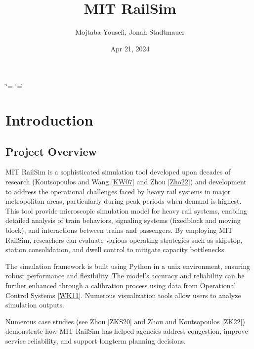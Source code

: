 \documentclass[letterpaper,10pt,english]{sphinxmanual}
\title{MIT RailSim}
\date{Apr 21, 2024}
\author{Mojtaba Yousefi, Jonah Stadtmauer}
\begin{document}
\ifdefined\shorthandoff
  \ifnum\catcode`\=\string=\active\shorthandoff{=}\fi
  \ifnum\catcode`\"=\active{}\fi
\fi

\pagestyle{empty}
\sphinxmaketitle
\pagestyle{plain}
\sphinxtableofcontents
\pagestyle{normal}
\label{\detokenize{index::doc}}


\sphinxstepscope


\chapter{Introduction}
\label{\detokenize{introduction:introduction}}\label{\detokenize{introduction::doc}}

\section{Project Overview}
\label{\detokenize{introduction:project-overview}}
\sphinxAtStartPar
MIT RailSim is a sophisticated simulation tool developed upon decades of research (Koutsopoulos and Wang {[}\hyperlink{cite.introduction:id7}{KW07}{]} and Zhou {[}\hyperlink{cite.introduction:id10}{Zho22}{]}) and development to address the operational challenges faced by heavy rail systems in major metropolitan areas, particularly during peak periods when demand is highest. This tool provide microscopic simulation model for heavy rail systems, enabling detailed analysis of train behaviors, signaling systems (fixed\sphinxhyphen{}block and moving block), and interactions between trains and passengers. By employing MIT RailSim, reseachers can evaluate various operating strategies such as skip\sphinxhyphen{}stop, station consolidation, and dwell control to mitigate capacity bottlenecks.

\sphinxAtStartPar
The simulation framework is built using Python in a unix environment, ensuring robust performance and flexibility. The model’s accuracy and reliability can be further enhanced through a calibration process using data from Operational Control Systems {[}\hyperlink{cite.introduction:id8}{WK11}{]}. Numerous visualization tools allow users to analyze simulation outputs.

\sphinxAtStartPar
Numerous case studies (see Zhou  {[}\hyperlink{cite.introduction:id9}{ZKS20}{]} and Zhou and Koutsopoulos {[}\hyperlink{cite.introduction:id11}{ZK22}{]}) demonstrate how MIT RailSim has helped agencies address congestion, improve service reliability, and support long\sphinxhyphen{}term planning decisions.
\end{document}
